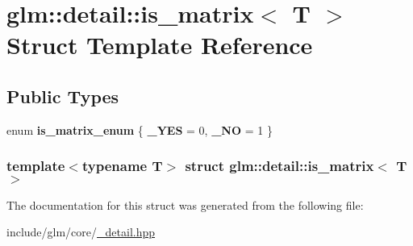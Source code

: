 \hypertarget{structglm_1_1detail_1_1is__matrix}{\section{glm\-:\-:detail\-:\-:is\-\_\-matrix$<$ \-T $>$ \-Struct \-Template \-Reference}
\label{structglm_1_1detail_1_1is__matrix}
}
\subsection*{\-Public \-Types}
\begin{DoxyCompactItemize}
\item 
enum {\bfseries is\-\_\-matrix\-\_\-enum} \{ {\bfseries \-\_\-\-Y\-E\-S} =  0, 
{\bfseries \-\_\-\-N\-O} =  1
 \}
\end{DoxyCompactItemize}
\subsubsection*{template$<$typename T$>$ struct glm\-::detail\-::is\-\_\-matrix$<$ T $>$}



\-The documentation for this struct was generated from the following file\-:\begin{DoxyCompactItemize}
\item 
include/glm/core/\hyperlink{__detail_8hpp}{\-\_\-detail.\-hpp}\end{DoxyCompactItemize}
